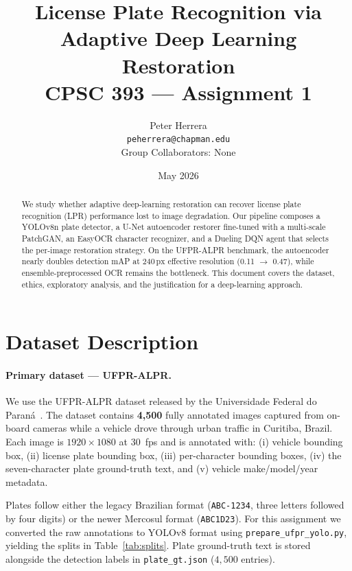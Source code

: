 \documentclass[11pt]{article}
\title{License Plate Recognition via Adaptive Deep Learning Restoration\\
       \large CPSC 393 --- Assignment 1}
\author{Peter Herrera \\ \texttt{peherrera@chapman.edu} \\ Group Collaborators: None}
\date{May 2026}
\begin{document}
\maketitle

\begin{abstract}
We study whether adaptive deep-learning restoration can recover license plate
recognition (LPR) performance lost to image degradation. Our pipeline composes
a YOLOv8n plate detector, a U-Net autoencoder restorer fine-tuned with a
multi-scale PatchGAN, an EasyOCR character recognizer, and a Dueling DQN agent
that selects the per-image restoration strategy. On the UFPR-ALPR benchmark,
the autoencoder nearly doubles detection mAP at $240\,\text{px}$ effective
resolution (0.11 $\to$ 0.47), while ensemble-preprocessed OCR remains the
bottleneck. This document covers the dataset, ethics, exploratory analysis,
and the justification for a deep-learning approach.
\end{abstract}

\section{Dataset Description}

\paragraph{Primary dataset --- UFPR-ALPR.}
We use the UFPR-ALPR dataset released by the Universidade Federal do
Paran\'a~\cite{ufpralpr}. The dataset contains \textbf{4{,}500} fully annotated
images captured from on-board cameras while a vehicle drove through urban
traffic in Curitiba, Brazil. Each image is $1920\times1080$ at 30~fps and is
annotated with: (i) vehicle bounding box, (ii) license plate bounding box,
(iii) per-character bounding boxes, (iv) the seven-character plate ground-truth
text, and (v) vehicle make/model/year metadata.

Plates follow either the legacy Brazilian format (\texttt{ABC-1234}, three
letters followed by four digits) or the newer Mercosul format
(\texttt{ABC1D23}). For this assignment we converted the raw annotations to
YOLOv8 format using \texttt{prepare\_ufpr\_yolo.py}, yielding the splits in
Table~\ref{tab:splits}. Plate ground-truth text is stored alongside the
detection labels in \texttt{plate\_gt.json} ($4{,}500$ entries).
\end{document}
